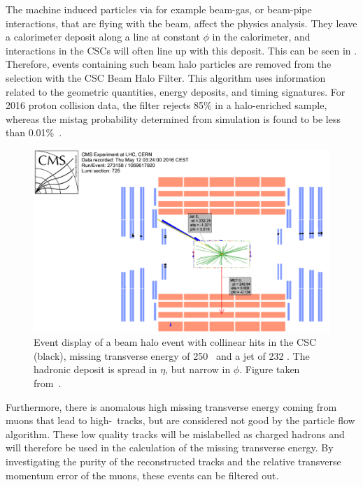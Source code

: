 The machine induced particles via for example beam-gas, or beam-pipe interactions, that are flying with the beam, affect the physics analysis. They leave a calorimeter deposit along a line at constant $\phi$ in the calorimeter, and interactions in the CSCs will often line up with this deposit. This can be seen in . Therefore, events containing such beam halo particles are removed from the selection with the CSC Beam Halo Filter. This algorithm uses information related to the geometric quantities, energy deposits, and timing signatures. For 2016 proton collision data, the filter rejects 85\% in a halo-enriched sample, whereas the mistag probability determined from simulation is found to  be less than 0.01\%~\cite{CMS-PAS-JME-16-004}.  
\begin{figure}[htbp]
	\centering
	\includegraphics[width=.7\linewidth]{5_EventSelection/Figures/Figure_004}
	\caption{Event display of a beam halo event with collinear hits in the CSC (black), missing transverse energy of 250 \GeV\, and a jet of 232 \GeV. The hadronic deposit is spread in $\eta$, but narrow in $\phi$. Figure taken from~\cite{CMS-PAS-JME-16-004}. }
	\label{fig:beamhalo}
\end{figure}

Furthermore, there is anomalous high missing transverse energy coming from muons that lead to high-\pt\ tracks, but are considered not good by the particle flow algorithm. These low quality tracks will be  mislabelled as charged hadrons and will therefore be used in the calculation of the missing transverse energy. By investigating the purity of the reconstructed tracks and the relative transverse momentum error of the muons, these events can be filtered out. 





